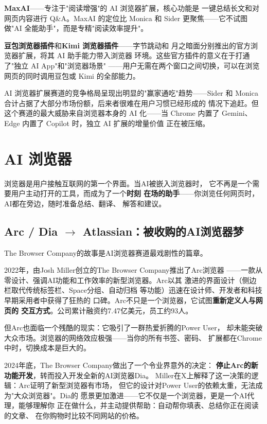 \textbf{MaxAI}——专注于"阅读增强"的 AI 浏览器扩展，核心功能是
一键总结长文和对网页内容进行 Q\&A。MaxAI 的定位比 Monica 和 Sider
更聚焦——它不试图做"AI 全能助手"，而是专精"阅读效率提升"。

\textbf{豆包浏览器插件}和\textbf{Kimi 浏览器插件}——字节跳动和
月之暗面分别推出的官方浏览器扩展，将其 AI 助手能力带入浏览器
环境。这些官方插件的意义在于打通了"独立 AI App"和"浏览器场景"
——用户无需在两个窗口之间切换，可以在浏览网页的同时调用豆包或
Kimi 的全部能力。

AI 浏览器扩展赛道的竞争格局呈现出明显的"赢家通吃"趋势——Sider
和 Monica 合计占据了大部分市场份额，后来者很难在用户习惯已经形成的
情况下追赶。但这个赛道的最大威胁来自浏览器本身的 AI 化——当 Chrome
内置了 Gemini、Edge 内置了 Copilot 时，独立 AI 扩展的增量价值
正在被压缩。


\section{AI 浏览器}
\label{sec:social-browsers}

浏览器是用户接触互联网的第一个界面。当AI被嵌入浏览器时，
它不再是一个需要用户主动打开的工具，而成为了一个\textbf{时刻
在场的助手}——你浏览任何网页时，AI都在旁边，随时准备总结、翻译、
解答和建议。

\subsection{Arc / Dia $\to$ Atlassian：被收购的AI浏览器梦}
\label{subsec:arc-browser}

The Browser Company的故事是AI浏览器赛道最戏剧性的篇章。

2022年，由Josh Miller创立的The Browser Company推出了Arc浏览器
——一款从零设计、强调AI功能和工作效率的新型浏览器。Arc以其
激进的界面设计（侧边栏取代传统标签栏、Space分组、自动归档
等功能）迅速在设计师、开发者和科技早期采用者中获得了狂热的
口碑。Arc不只是一个浏览器，它试图\textbf{重新定义人与网页的
交互方式}。公司累计融资约7.47亿美元，员工约93人。

但Arc也面临一个残酷的现实：它吸引了一群热爱折腾的Power User，
却未能突破大众市场。浏览器的网络效应极强——当你的所有书签、密码、
扩展都在Chrome中时，切换成本是巨大的。

2024年底，The Browser Company做出了一个令业界意外的决定：
\textbf{停止Arc的新功能开发}，转而投入开发全新的AI浏览器Dia。
Miller在X上解释了这一决策的逻辑：Arc证明了新型浏览器有市场，
但它的设计对Power User的依赖太重，无法成为"大众浏览器"。Dia的
愿景更加激进——它不仅是一个浏览器，更是一个AI代理，能够理解你
正在做什么，并主动提供帮助：自动帮你填表、总结你正在阅读的文章、
在你购物时比较不同网站的价格。

